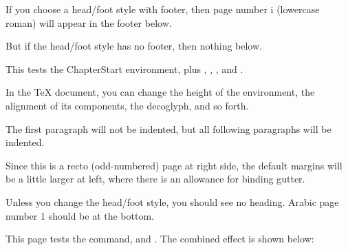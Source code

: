 \documentclass[test,shademargins,draft]{novel} %
\begin{document}
\frontmatter %

\thispagestyle{footer}
\vspace*{5\nbs}
\begin{center}
\par
\vspace{1.5\nbs}
\par
\vspace{4\nbs}
\vspace{2\nbs}
\par
\vfill
If you choose a head/foot style with footer, then page number i (lowercase roman) will appear in the footer below.\par
But if the head/foot style has no footer, then nothing below.\par
\end{center}
\clearpage


\mainmatter

\begin{ChapterStart}[10]
\vspace*{3\nbs}
\end{ChapterStart}

This tests the ChapterStart environment, plus \string\ChapterTitle, \string\ChapterSubtitle, \string\ChapterDeco, and \string\decoglyph.

In the TeX document, you can change the height of the environment, the alignment of its components, the decoglyph, and so forth.

The first paragraph will not be indented, but all following paragraphs will be indented.

Since this is a recto (odd-numbered) page at right side, the default margins will be a little larger at left, where there is an allowance for binding gutter.

Unless you change the head/foot style, you should see no heading. Arabic page number 1 should be at the bottom.

\clearpage



This page tests the \string\charscale\space command, and \string\rotatebox. The combined effect is shown below:\par
\vspace{1.5\nbs} %
\vspace{7.5\nbs} %
\end{document}
